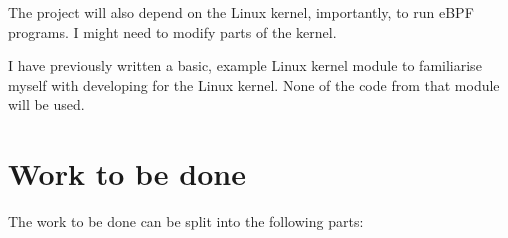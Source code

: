    The project will also depend on the Linux kernel, importantly, to run eBPF programs.
    I might need to modify parts of the kernel.


    I have previously written a basic, example Linux kernel module to familiarise myself with developing for the 
    Linux kernel. None of the code from that module will be used. 

\section*{Work to be done}

    The work to be done can be split into the following parts:

